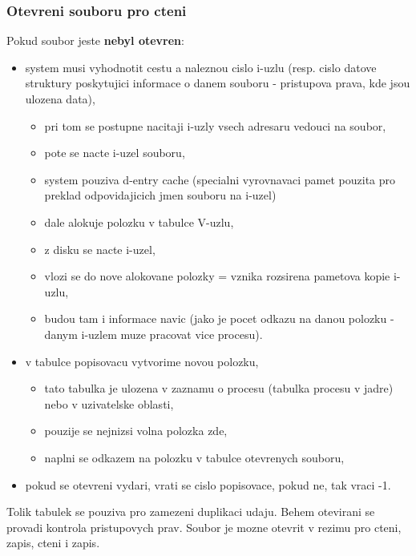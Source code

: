 \documentclass[a4paper, 11pt]{article}
\begin{document}
\subsubsection{Otevreni souboru pro cteni}
Pokud soubor jeste \textbf{nebyl otevren}:
\begin{itemize}
    \item system musi vyhodnotit cestu a naleznou cislo i-uzlu (resp. cislo datove struktury poskytujici informace o danem souboru - pristupova prava, kde jsou ulozena data),
    \begin{itemize}
        \item pri tom se postupne nacitaji i-uzly vsech adresaru vedouci na soubor,
        \item pote se nacte i-uzel souboru,
        \item system pouziva d-entry cache (specialni vyrovnavaci pamet pouzita pro preklad odpovidajicich jmen souboru na i-uzel) 
        \item dale alokuje polozku v tabulce V-uzlu,
    \end{itemize}
    \begin{itemize}
        \item z disku se nacte i-uzel,
        \item vlozi se do nove alokovane polozky = vznika rozsirena pametova kopie i-uzlu,
        \item budou tam i informace navic (jako je pocet odkazu na danou polozku - danym i-uzlem muze pracovat vice procesu).
    \end{itemize}
    \item v tabulce popisovacu vytvorime novou polozku,
    \begin{itemize}
        \item tato tabulka je ulozena v zaznamu o procesu (tabulka procesu v jadre) nebo v uzivatelske oblasti,
        \item pouzije se nejnizsi volna polozka zde,
        \item naplni se odkazem na polozku v tabulce otevrenych souboru,
    \end{itemize}
    \item pokud se otevreni vydari, vrati se cislo popisovace, pokud ne, tak vraci -1. \\
\end{itemize}

Tolik tabulek se pouziva pro zamezeni duplikaci udaju. Behem otevirani se provadi kontrola pristupovych prav. Soubor je mozne otevrit v rezimu pro cteni, zapis, cteni i zapis. \\
\end{document}
